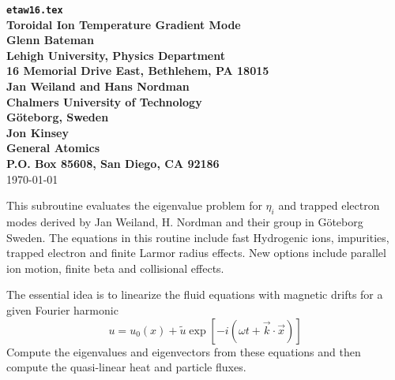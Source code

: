 
\headheight 0pt \headsep 0pt          
\topmargin 0pt  \textheight 9.0in
\oddsidemargin 0pt \textwidth 6.5in

\newcommand{\Partial}[2]{\frac{\partial #1}{\partial #2}}
\newcommand{\jacobian}{{\cal J}}



\begin{center} 
{\bf {\tt etaw16.tex} \\
Toroidal Ion Temperature Gradient Mode \\
\vspace{1pc}
Glenn Bateman \\
Lehigh University, Physics Department \\
16 Memorial Drive East, Bethlehem, PA 18015 \\
\vspace{1pc}
Jan Weiland and Hans Nordman \\
Chalmers University of Technology \\
G\"{o}teborg, Sweden \\
\vspace{1pc}
Jon Kinsey \\
General Atomics \\
P.O. Box 85608, San Diego, CA 92186} \\ 
\vspace{1pc}
\today
\end{center}
This subroutine evaluates the eigenvalue problem for $\eta_i$
and trapped electron modes derived by 
Jan Weiland, H. Nordman and their group in G\"{o}teborg Sweden.
The equations in this routine include fast Hydrogenic ions,
impurities, trapped electron and finite Larmor radius effects.
New options include parallel ion motion, 
finite beta and collisional effects.

The essential idea is to linearize the fluid equations 
with magnetic drifts for a given Fourier harmonic
\[ u = u_0(x) + \tilde{u} \exp\left[ -i (\omega t
   + \vec{k} \cdot \vec{x} ) \right] \]
Compute the eigenvalues and eigenvectors from these equations and then
compute the quasi-linear heat and particle fluxes.


